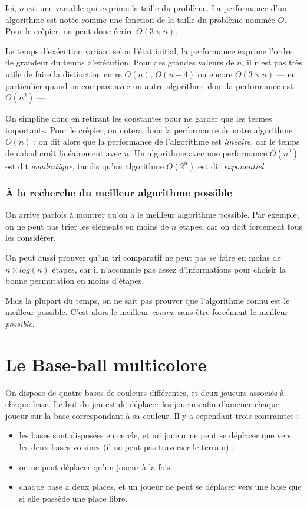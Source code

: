 \documentclass[a5paper,pagesize,DIV=14]{scrbook}
\begin{document}
Ici, $n$ est une variable qui exprime la taille du problème. La performance d'un algorithme est notée comme une fonction de la taille du problème nommée $O$. Pour le crêpier, on peut donc écrire $O(3 \times n)$.

Le temps d'exécution variant selon l'état initial, la performance exprime
l'ordre de grandeur du temps d'exécution. Pour des grandes valeurs de $n$, il
n'est pas très utile de faire la distinction entre $O(n)$, $O(n+4)$ ou encore
$O(3 \times n)$ --- en particulier quand on compare avec un autre algorithme
dont la performance est $O(n^2)$ ---. 

On simplifie donc en retirant les constantes pour ne garder que les termes importants. Pour le crêpier, on notera donc la performance de notre algorithme $O(n)$ ; on dit alors que la performance de l'algorithme est \textit{linéaire}, car le temps de calcul croît linéairement avec $n$. Un algorithme avec une performance $O(n^2)$ est dit \textit{quadratique}, tandis qu'un algorithme $O(2^n)$ est dit \textit{exponentiel}.

\subsection*{À la recherche du meilleur algorithme possible}

On arrive parfois à montrer qu'on a le meilleur algorithme possible. Par exemple, on ne peut pas trier les éléments en moins de $n$ étapes, car on doit forcément tous les considérer.

On peut aussi prouver qu'un tri comparatif ne peut pas se faire en moins de
$n\times log(n)$ étapes, car il n'accumule pas assez d'informations pour choisir la bonne permutation en moins d'étapes.

Mais la plupart du temps, on ne sait pas prouver que l'algorithme connu est le meilleur possible. C'est alors le meilleur \textit{connu}, sans être forcément le meilleur \textit{possible}.
    
\chapter*{Le Base-ball multicolore}

On dispose de quatre bases de couleurs différentes, et deux joueurs associés à
chaque base. Le but du jeu est de déplacer les joueurs afin d'amener chaque joueur sur la base correspondant à sa couleur. Il y a cependant trois contraintes :

\begin{itemize}
  \item les bases sont disposées en cercle, et un joueur ne peut se déplacer que vers les deux bases voisines (il ne peut pas traverser le terrain) ;
  \item on ne peut déplacer qu'un joueur à la fois ;
  \item chaque base a deux places, et un joueur ne peut se déplacer vers une base que si elle possède une place libre.
\end{itemize}
\end{document}
